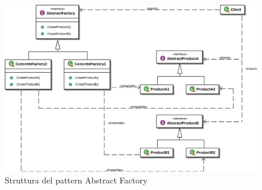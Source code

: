 	\begin{figure}[!h]
		\centering
		\includegraphics[scale=0.2]{img/abstract_factory}  
		\caption{Struttura del pattern Abstract Factory}
	\end{figure}
	
